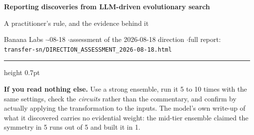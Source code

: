 \documentclass[9pt]{extarticle}
\begin{document}
{\LARGE\bfseries Reporting discoveries from LLM-driven evolutionary search}\par
\vspace{2pt}
{\large\color{accc} A practitioner's rule, and the evidence behind it}\par
\vspace{2pt}
{\footnotesize Banana Labs \quad$\cdot$-08-18 \quad$\cdot$\quad assessment of the 2026-08-18 direction \quad$\cdot$\quad full report: \texttt{transfer-sn/DIRECTION\_ASSESSMENT\_2026-08-18.html}}\par
\vspace{4pt}
{\color{rulec}\hrule height 0.7pt}
\vspace{5pt}

\begin{tcolorbox}[colback=white,colframe=rulec,boxrule=0.5pt,arc=2pt,left=6pt,right=6pt,top=4pt,bottom=4pt]
{\footnotesize\textbf{If you read nothing else.} Use a strong ensemble, run it 5 to 10 times with the
same settings, check the \emph{circuits} rather than the commentary, and confirm by actually applying
the transformation to the inputs. The model's own write-up of what it discovered carries no evidential
weight: the mid-tier ensemble claimed the symmetry in 5 runs out of 5 and built it in 1.}
\end{tcolorbox}
\end{document}
